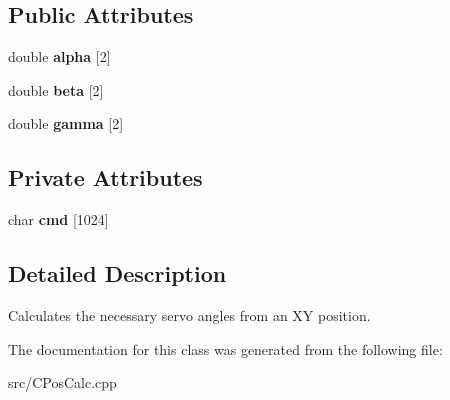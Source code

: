 \subsection*{Public Attributes}
\begin{DoxyCompactItemize}
\item 
\hypertarget{class_c_pos_calc_a1fd06482ece8b9e2671e5bf01baa5577}{
double {\bfseries alpha} \mbox{[}2\mbox{]}}
\label{class_c_pos_calc_a1fd06482ece8b9e2671e5bf01baa5577}

\item 
\hypertarget{class_c_pos_calc_ae4645d9df99344e00fe7052d90b76c9e}{
double {\bfseries beta} \mbox{[}2\mbox{]}}
\label{class_c_pos_calc_ae4645d9df99344e00fe7052d90b76c9e}

\item 
\hypertarget{class_c_pos_calc_a2970d95fef1df744a732b4ae376f5c41}{
double {\bfseries gamma} \mbox{[}2\mbox{]}}
\label{class_c_pos_calc_a2970d95fef1df744a732b4ae376f5c41}

\end{DoxyCompactItemize}
\subsection*{Private Attributes}
\begin{DoxyCompactItemize}
\item 
\hypertarget{class_c_pos_calc_ae214a276150b5f8d7a8ae0f532425253}{
char {\bfseries cmd} \mbox{[}1024\mbox{]}}
\label{class_c_pos_calc_ae214a276150b5f8d7a8ae0f532425253}

\end{DoxyCompactItemize}


\subsection{Detailed Description}
Calculates the necessary servo angles from an XY position. 

The documentation for this class was generated from the following file:\begin{DoxyCompactItemize}
\item 
src/CPosCalc.cpp\end{DoxyCompactItemize}
